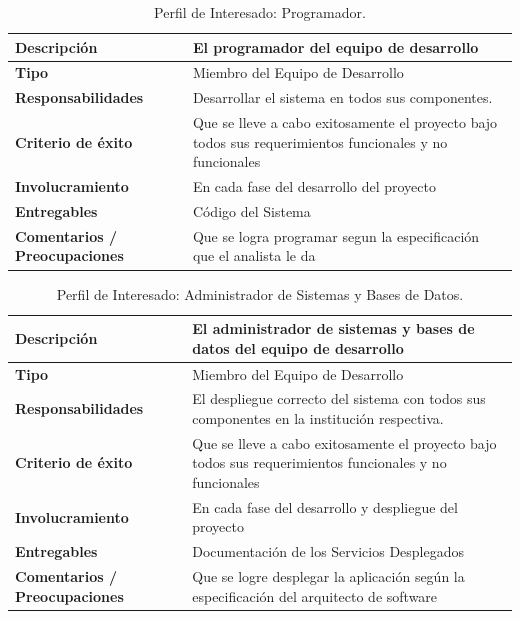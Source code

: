\vfill

\begin{table}[h!]
  \begin{tabular}{|p{}|p{}|}
    \hline
    \textbf{Descripción} & El programador del equipo de desarrollo \\
    \hline
    \textbf{Tipo} & Miembro del Equipo de Desarrollo \\
    \hline
    \textbf{Responsabilidades} & Desarrollar el sistema en todos sus componentes. \\
    \hline
    \textbf{Criterio de éxito} & Que se lleve a cabo exitosamente el proyecto bajo todos sus requerimientos funcionales y no funcionales \\
    \hline
    \textbf{Involucramiento} & En cada fase del desarrollo del proyecto \\
    \hline
    \textbf{Entregables} & Código del Sistema \\
    \hline
    \textbf{Comentarios / Preocupaciones} & Que se logra programar segun la especificación que el analista le da \\
    \hline
  \end{tabular}
  \caption{Perfil de Interesado: Programador.}
  \label{per-inter-programer}
\end{table}

\pagebreak

\begin{table}[h!]
  \begin{tabular}{|p{}|p{}|}
    \hline
    \textbf{Descripción} & El administrador de sistemas y bases de datos del equipo de desarrollo \\
    \hline
    \textbf{Tipo} & Miembro del Equipo de Desarrollo \\
    \hline
    \textbf{Responsabilidades} & El despliegue correcto del sistema con todos sus componentes en la institución respectiva. \\
    \hline
    \textbf{Criterio de éxito} & Que se lleve a cabo exitosamente el proyecto bajo todos sus requerimientos funcionales y no funcionales \\
    \hline
    \textbf{Involucramiento} & En cada fase del desarrollo y despliegue del proyecto \\
    \hline
    \textbf{Entregables} & Documentación de los Servicios Desplegados \\
    \hline
    \textbf{Comentarios / Preocupaciones} & Que se logre desplegar la aplicación según la especificación del arquitecto de software \\
    \hline
  \end{tabular}
  \caption{Perfil de Interesado: Administrador de Sistemas y Bases de Datos.}
  \label{per-inter-admn}
\end{table}

